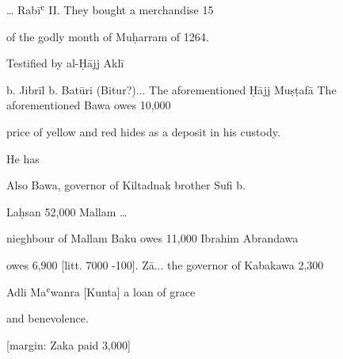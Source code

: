 \documentclass[12pt]{article}
\begin{document}
\begin{pages}
\begin{Rightside}
{\dots} Rabīʿ II. They bought a merchandise 15

of the godly month of Muḥarram of 1264.

Testified by al-Ḥājj Aklī

b. Jibrīl b. Batūri (Bitur?)... The aforementioned Ḥājj Muṣṭafā  The aforementioned Bawa owes 10,000

price of yellow and red hides as a deposit in his custody.

He has

Also Bawa,  governor of Kiltadnak brother Sufi b.

 Laḥsan 52,000 Mallam {\dots}

 nieghbour of Mallam Baku owes 11,000 Ibrahim Abrandawa

 owes 6,900 [litt. 7000 -100]. Zā... the governor of Kabakawa 2,300

 Adli Maʿwanra [Kunta] a loan of grace

 and benevolence.

 [margin: Zaka paid 3,000]


\pend
\endnumbering
\end{Rightside}

\end{pages}
\Pages
\end{document}
